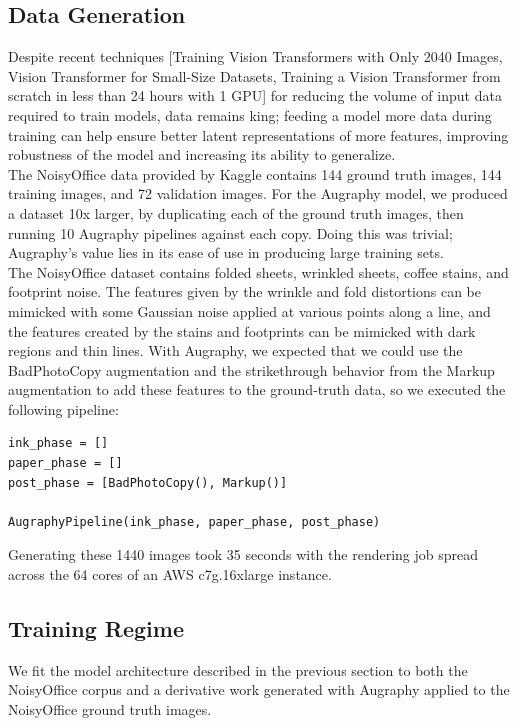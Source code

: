 \documentclass[runningheads]{article}
\begin{document}
\subsection{Data Generation}
\label{sec:orgd8c063f}
Despite recent techniques [Training Vision Transformers with Only 2040 Images, Vision Transformer for Small-Size Datasets, Training a Vision Transformer from scratch in less than 24 hours with 1 GPU] for reducing the volume of input data required to train models, data remains king; feeding a model more data during training can help ensure better latent representations of more features, improving robustness of the model and increasing its ability to generalize.\\

The NoisyOffice data provided by Kaggle contains 144 ground truth images, 144 training images, and 72 validation images. For the Augraphy model, we produced a dataset 10x larger, by duplicating each of the ground truth images, then running 10 Augraphy pipelines against each copy. Doing this was trivial; Augraphy's value lies in its ease of use in producing large training sets.\\

The NoisyOffice dataset contains folded sheets, wrinkled sheets, coffee stains, and footprint noise. The features given by the wrinkle and fold distortions can be mimicked with some Gaussian noise applied at various points along a line, and the features created by the stains and footprints can be mimicked with dark regions and thin lines. With Augraphy, we expected that we could use the BadPhotoCopy augmentation and the strikethrough behavior from the Markup augmentation to add these features to the ground-truth data, so we executed the following pipeline:

\begin{verbatim}
ink_phase = []
paper_phase = []
post_phase = [BadPhotoCopy(), Markup()]

AugraphyPipeline(ink_phase, paper_phase, post_phase)
\end{verbatim}

Generating these 1440 images took 35 seconds with the rendering job spread across the 64 cores of an AWS c7g.16xlarge instance.

\subsection{Training Regime}
\label{sec:org4144ef4}
We fit the model architecture described in the previous section to both the NoisyOffice corpus and a derivative work generated with Augraphy applied to the NoisyOffice ground truth images.\\
\end{document}
